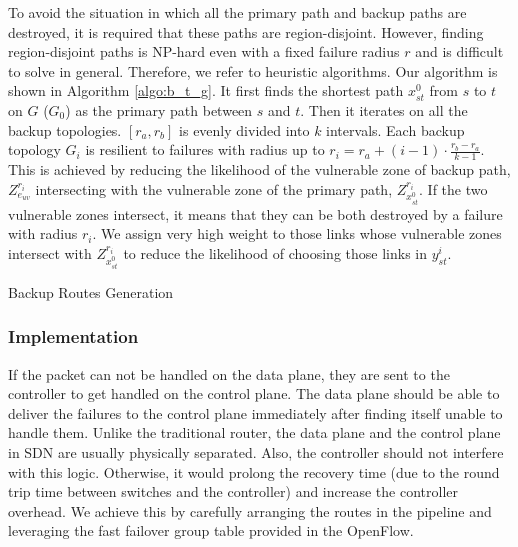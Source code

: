 \documentclass[10pt,journal]{IEEEtran}
\begin{document}
To avoid the situation in which all the primary path and backup paths are destroyed, it is required that these paths are region-disjoint\cite{T13cra}. However, finding region-disjoint paths is NP-hard even with a fixed failure radius $r$ \cite{T13cra} and is difficult to solve in general. Therefore, we refer to heuristic algorithms.
Our algorithm is shown in Algorithm \ref{algo:b_t_g}. It first finds the shortest path $x_{st}^{0}$ from $s$ to $t$ on $G$ ($G_0$) as the primary path between $s$ and $t$. Then it iterates on all the backup topologies. $[r_a, r_b]$ is evenly divided into $k$ intervals. Each backup topology $G_i$ is resilient to failures with radius up to $r_{i}=r_a+(i-1)\cdot\frac{r_b-r_a}{k-1}$. This is achieved by reducing the likelihood of the vulnerable zone of backup path, $Z_{e_{uv}}^{r_{i}}$ intersecting with the vulnerable zone of the primary path, $Z_{x_{st}^{0}}^{r_{i}}$.
If the two vulnerable zones intersect, it means that they can be both destroyed by a failure with radius $r_i$. We assign very high weight to those links whose vulnerable zones intersect with $Z_{x_{st}^{0}}^{r_{i}}$ to reduce the likelihood of choosing those links in $y_{st}^{i}$.

\begin{algorithm}[!ht]
\caption{Backup Routes Generation}
\label{algo:b_t_g}
\end{algorithm}



\subsubsection{Implementation}
If the packet can not be handled on the data plane, they are sent to the controller to get handled on the control plane. The data plane should be able to deliver the failures to the control plane immediately after finding itself unable to handle them. Unlike the traditional router, the data plane and the control plane in SDN are usually physically separated. Also, the controller should not interfere with this logic. Otherwise, it would prolong the recovery time (due to the round trip time between switches and the controller) and increase the controller overhead.
We achieve this by carefully arranging the routes in the pipeline and leveraging the fast failover group table provided in the OpenFlow.
\end{document}
